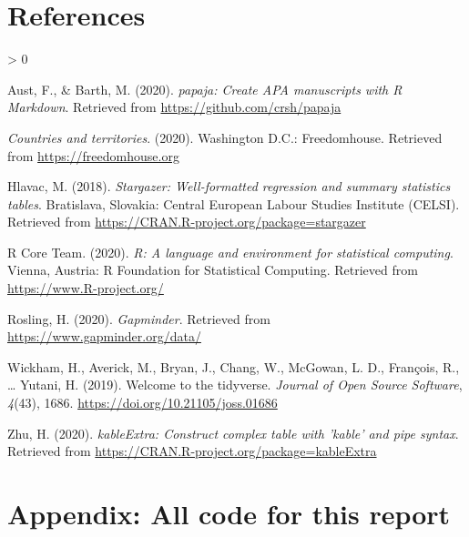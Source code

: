 \documentclass[
  english,
  man,floatsintext]{apa6}
\newlength{\cslhangindent}
\newenvironment{CSLReferences}[2] %
 {%
  \setlength{\parindent}{0pt}
  \ifodd #1 \everypar{\setlength{\hangindent}{\cslhangindent}}\ignorespaces\fi
  \ifnum #2 > 0
  \setlength{\parskip}{#2\baselineskip}
  \fi
 }%
 {}
\begin{document}
\newpage

\hypertarget{references}{%
\section{References}\label{references}}

\begingroup
\setlength{\parindent}{-0.5in}
\setlength{\leftskip}{0.5in}

\hypertarget{refs}{}
\begin{CSLReferences}{1}{0}
\leavevmode\hypertarget{ref-R-papaja}{}%
Aust, F., \& Barth, M. (2020). \emph{{papaja}: {Create} {APA} manuscripts with {R Markdown}}. Retrieved from \url{https://github.com/crsh/papaja}

\leavevmode\hypertarget{ref-Freedomhouse}{}%
\emph{Countries and territories}. (2020). Washington D.C.: Freedomhouse. Retrieved from \url{https://freedomhouse.org}

\leavevmode\hypertarget{ref-R-stargazer}{}%
Hlavac, M. (2018). \emph{Stargazer: Well-formatted regression and summary statistics tables}. Bratislava, Slovakia: Central European Labour Studies Institute (CELSI). Retrieved from \url{https://CRAN.R-project.org/package=stargazer}

\leavevmode\hypertarget{ref-R-base}{}%
R Core Team. (2020). \emph{R: A language and environment for statistical computing}. Vienna, Austria: R Foundation for Statistical Computing. Retrieved from \url{https://www.R-project.org/}

\leavevmode\hypertarget{ref-Gapminder}{}%
Rosling, H. (2020). \emph{Gapminder}. Retrieved from \url{https://www.gapminder.org/data/}

\leavevmode\hypertarget{ref-R-tidyverse}{}%
Wickham, H., Averick, M., Bryan, J., Chang, W., McGowan, L. D., François, R., \ldots{} Yutani, H. (2019). Welcome to the {tidyverse}. \emph{Journal of Open Source Software}, \emph{4}(43), 1686. \url{https://doi.org/10.21105/joss.01686}

\leavevmode\hypertarget{ref-R-kableExtra}{}%
Zhu, H. (2020). \emph{kableExtra: Construct complex table with 'kable' and pipe syntax}. Retrieved from \url{https://CRAN.R-project.org/package=kableExtra}

\end{CSLReferences}

\endgroup

\newpage

\hypertarget{appendix-all-code-for-this-report}{%
\section{Appendix: All code for this report}\label{appendix-all-code-for-this-report}}
\end{document}

